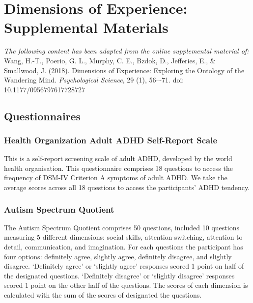 
\appendix
\setcounter{chapter}{0}

\renewcommand{\chaptername}{Appendix}
\renewcommand{\theequation}{\Alph{chapter}.\arabic{section}.\arabic{equation}}
\setcounter{equation}{0}


\chapter{Dimensions of Experience: Supplemental Materials}
\label{appendix:study1}
\textit{The following content has been adapted from the online supplemental material of: }\\
Wang, H.-T., Poerio, G. L., Murphy, C. E., Bzdok, D., Jefferies, E., \& Smallwood, J. (2018). Dimensions of Experience: Exploring the Ontology of the Wandering Mind. \textit{Psychological Science}, 29 (1), 56–-71. doi: 10.1177/0956797617728727
\section{Questionnaires}
\label{appendix:study1:subsection1}

\subsection{Health Organization Adult ADHD Self-Report Scale}
This is a self-report screening scale of adult ADHD, developed by the world health organisation\cite{Kessler2005}. This questionnaire comprises 18 questions to access the frequency of DSM-IV Criterion A symptoms of adult ADHD. We take the average scores across all 18 questions to access the participants’ ADHD tendency.

\subsection{Autism Spectrum Quotient}
The Autism Spectrum Quotient \cite{Baron-Cohen2001} comprises 50 questions, included 10 questions measuring 5 different dimensions: social skills, attention switching, attention to detail, communication, and imagination. For each questions the participant has four options: definitely agree, slightly agree, definitely disagree, and slightly disagree. ‘Definitely agree’ or ‘slightly agree’ responses scored 1 point on half of the designated questions.  ‘Definitely disagree’ or ‘slightly disagree’ responses scored 1 point on the other half of the questions.  The scores of each dimension is calculated with the sum of the scores of designated the questions.

